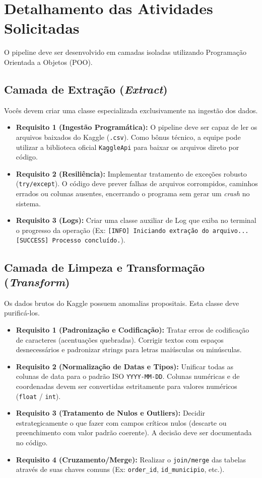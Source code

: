 \documentclass[12pt,a4paper]{article}
\begin{document}
	\section{Detalhamento das Atividades Solicitadas}
	O pipeline deve ser desenvolvido em camadas isoladas utilizando Programação Orientada a Objetos (POO).
	
	\subsection{Camada de Extração (\textit{Extract})}
	Vocês devem criar uma classe especializada exclusivamente na ingestão dos dados.
	\begin{itemize}
		\item \textbf{Requisito 1 (Ingestão Programática):} O pipeline deve ser capaz de ler os arquivos baixados do Kaggle (\texttt{.csv}). Como bônus técnico, a equipe pode utilizar a biblioteca oficial \texttt{KaggleApi} para baixar os arquivos direto por código.
		\item \textbf{Requisito 2 (Resiliência):} Implementar tratamento de exceções robusto (\texttt{try/except}). O código deve prever falhas de arquivos corrompidos, caminhos errados ou colunas ausentes, encerrando o programa sem gerar um \textit{crash} no sistema.
		\item \textbf{Requisito 3 (Logs):} Criar uma classe auxiliar de Log que exiba no terminal o progresso da operação (Ex: \texttt{[INFO] Iniciando extração do arquivo... [SUCCESS] Processo concluído.}).
	\end{itemize}
	
	\subsection{Camada de Limpeza e Transformação (\textit{Transform})}
	Os dados brutos do Kaggle possuem anomalias propositais. Esta classe deve purificá-los.
	\begin{itemize}
		\item \textbf{Requisito 1 (Padronização e Codificação):} Tratar erros de codificação de caracteres (acentuações quebradas). Corrigir textos com espaços desnecessários e padronizar strings para letras maiúsculas ou minúsculas.
		\item \textbf{Requisito 2 (Normalização de Datas e Tipos):} Unificar todas as colunas de data para o padrão ISO \texttt{YYYY-MM-DD}. Colunas numéricas e de coordenadas devem ser convertidas estritamente para valores numéricos (\texttt{float} / \texttt{int}).
		\item \textbf{Requisito 3 (Tratamento de Nulos e Outliers):} Decidir estrategicamente o que fazer com campos críticos nulos (descarte ou preenchimento com valor padrão coerente). A decisão deve ser documentada no código.
		\item \textbf{Requisito 4 (Cruzamento/Merge):} Realizar o \texttt{join/merge} das tabelas através de suas chaves comuns (Ex: \texttt{order\_id}, \texttt{id\_municipio}, etc.).
	\end{itemize}
	
\end{document}
